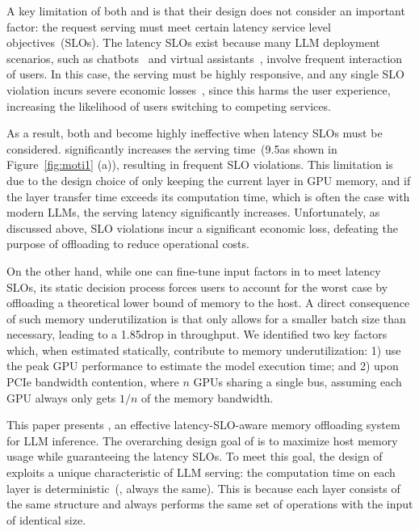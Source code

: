 A key limitation of both \deepspeed and \flexgen is that their design 
does not consider an important factor: the request serving must meet 
certain latency service level objectives~(SLOs).  
%
The latency SLOs exist because many LLM deployment scenarios, such as
chatbots~\cite{chatbot1, chatbot2} and virtual assistants~\cite{virtualassist}, involve frequent interaction of users.  
%
In this case, the serving must be highly responsive, and any single SLO 
violation incurs severe economic losses~\cite{SLOeconomy}, since this harms the user experience, increasing the likelihood of users switching to competing services. 
%

As a result, both \deepspeed and \flexgen become highly ineffective when latency SLOs must be considered.  
%
\deepspeed significantly increases the serving time~(9.5\X as shown in 
Figure~\ref{fig:moti1} (a)), resulting in frequent SLO violations. 
%
This limitation is due to the design choice of only keeping the current layer 
in GPU memory, and if the layer transfer time exceeds its computation time, 
which is often the case with modern LLMs, the serving latency significantly 
increases.
%
Unfortunately, as discussed above, SLO violations incur a significant economic loss, defeating the purpose of offloading to reduce operational costs. 

On the other hand, while one can fine-tune input factors in \flexgen to 
meet latency SLOs, its static decision process forces users to account for the worst case by offloading a theoretical lower bound of memory to the 
host.  
%
A direct consequence of such memory underutilization is that \flexgen only allows for a smaller batch size than necessary, leading to a 1.85\X drop in throughput. 
%
We identified two key factors which, when estimated statically, contribute to memory underutilization:
%
1) use the peak GPU performance to estimate the model
execution time; and 2) upon PCIe bandwidth contention, where 
$n$ GPUs sharing a single bus, assuming each GPU always only gets $1/n$ of the memory bandwidth. 


This paper presents \sys, an effective latency-SLO-aware memory offloading system for LLM inference. 
%
The overarching design goal of \sys is to maximize host memory usage 
while guaranteeing the latency SLOs. 
%
To meet this goal, the design of \sys exploits a unique characteristic of LLM 
serving: the computation time on each layer is deterministic~(\ie, 
always the same). 
%
This is because each layer consists of the same structure and always performs the same set of operations with the input of identical size. 

